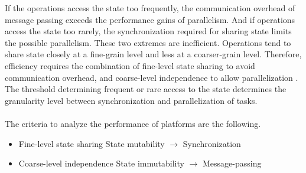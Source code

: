 If the operations access the state too frequently, the communication overhead of message passing exceeds the performance gains of parallelism.
And if operations access the state too rarely, the synchronization required for sharing state limits the possible parallelism.
These two extremes are inefficient.
Operations tend to share state closely at a fine-grain level and less at a coarser-grain level.
Therefore, efficiency requires the combination of fine-level state sharing to avoid communication overhead, and coarse-level independence to allow parallelization \cite{Gustafson1988,Gunther1996,Nelson1996,Gunther2002}.
The threshold determining frequent or rare access to the state determines the granularity level between synchronization and parallelization of tasks.

\paragraph{}

The criteria to analyze the performance of platforms are the following.

\begin{itemize}
\item Fine-level state sharing
  \subitem State mutability $\to$ Synchronization
\item Coarse-level independence
  \subitem State immutability $\to$ Message-passing
\end{itemize}




